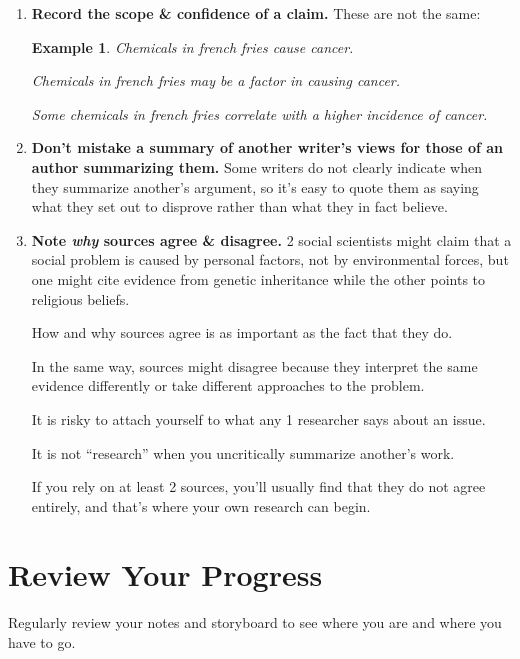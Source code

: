 \documentclass[oneside]{book}
\numberwithin{equation}{section}
\newtheorem{example}{Example}[section]
\begin{document}
\begin{enumerate}
    He \textit{conceded} a point to set up a point he wanted to make.
    
    Anyone who deliberately misrepresents an author in this way violates basic standards of truth.
    
    But you can make such a mistake inadvertently if you note only a source's words and not their role in an argument.
    \item \textbf{Record the scope \& confidence of a claim.} These are not the same:
    \begin{example}
        Chemicals in french fries cause cancer.
        
        Chemicals in french fries may be a factor in causing cancer.
        
        Some chemicals in french fries correlate with a higher incidence of cancer.
    \end{example}
    \item \textbf{Don't mistake a summary of another writer's views for those of an author summarizing them.} Some writers do not clearly indicate when they summarize another's argument, so it's easy to quote them as saying what they set out to disprove rather than what they in fact believe.
    \item \textbf{Note \textit{why} sources agree \& disagree.} 2 social scientists might claim that a social problem is caused by personal factors, not by environmental forces, but one might cite evidence from genetic inheritance while the other points to religious beliefs.
    
    How and why sources agree is as important as the fact that they do.
    
    In the same way, sources might disagree because they interpret the same evidence differently or take different approaches to the problem.
    
    It is risky to attach yourself to what any 1 researcher says about an issue.
    
    It is not ``research'' when you uncritically summarize another's work.
    
    If you rely on at least 2 sources, you'll usually find that they do not agree entirely, and that's where your own research can begin.
\end{enumerate}

\section{Review Your Progress}
Regularly review your notes and storyboard to see where you are and where you have to go.
\end{document}

